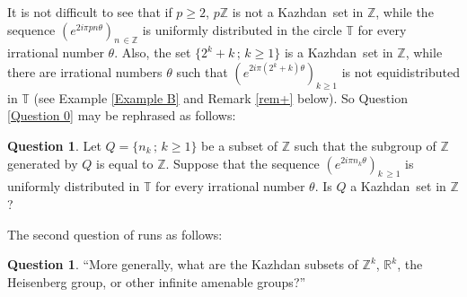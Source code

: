 \documentclass[11pt,english,a4paper]{smfart}
\numberwithin{equation}{section}
\theoremstyle{definition}
\newtheorem{question}[theorem]{Question}
\begin{document}
It is not difficult to see that if $p\ge 2$, $p{\ensuremath{\mathbb Z}}$ is not a {Kazhdan}\ set in 
${\ensuremath{\mathbb Z}}$, while the sequence $(e^{2i\pi pn\theta })_{n\,\in{\ensuremath{\mathbb Z}}}$ is uniformly 
distributed  in the circle ${\ensuremath{\mathbb T}}$ for every irrational number $\theta $. 
Also, the set $\{2^{k}+k\,;\,k\ge 1\}$ is a {Kazhdan}\ set in ${\ensuremath{\mathbb Z}}$, while 
there are irrational numbers $\theta $ such that $(e^{2i\pi (2^{k}+k)\theta 
})_{k\ge 1}$ is not equidistributed in ${\ensuremath{\mathbb T}}$ (see Example \ref{Example B} and Remark \ref{rem+} below). 
So Question 
\ref{Question 0} may be rephrased as follows:
\begin{question}\label{Question 1}
 Let ${Q}=\{n_{k}\,;\,k\ge 1\}$  be a subset of ${\ensuremath{\mathbb Z}}$ such that the subgroup of ${\ensuremath{\mathbb Z}}$ 
generated by ${Q}$ is equal to {\ensuremath{\mathbb Z}}. Suppose that the 
sequence $(e^{2i\pi n_{k}\theta })_{k\,\ge 1}$ is uniformly distributed in 
${\ensuremath{\mathbb T}}$ for every irrational number $\theta $. Is ${Q}$ a {Kazhdan}\ set in ${\ensuremath{\mathbb Z}}$?
\end{question}

The second question of \cite[Sec.~7.12]{BdHV} runs as follows:

\begin{question}\label{Question 00}\cite[Sec.~7.12]{BdHV}
``More generally, what are the Kazhdan subsets 
of  ${\ensuremath{\mathbb Z}}^k$, ${\ensuremath{\mathbb R}}^k$, the Heisenberg group, or other infinite amenable groups?''
\end{question}
\end{document}
